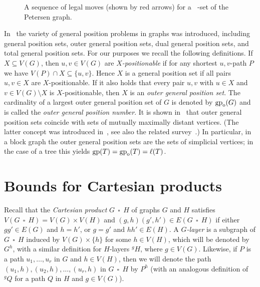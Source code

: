 \documentclass[a4paper,12pt]{article}
\DeclareMathOperator{\mob}{Mob_{gp}}
\DeclareMathOperator{\gp}{gp}
\DeclareMathOperator{\cp}{\,\square\,}
\newcommand{\gpo}{\gp_{\rm o}}
\theoremstyle{definition}
\begin{document}
\begin{figure}[ht!]
		
		\caption{A sequence of legal moves (shown by red arrows) for a $\mob$-set of the Petersen graph.}\label{fig:Petersen-moves}
	\end{figure}
	
	In~\cite{tian-2024+} the variety of general position problems in graphs was introduced, including general position sets, outer general position sets, dual general position sets, and total general position sets. For our purposes we recall the following definitions. If $X\subseteq V(G)$, then $u,v\in V(G)$ are {\em $X$-positionable} if for any shortest $u,v$-path $P$ we have $V(P)\cap X \subseteq \{u,v\}$. Hence $X$ is a general position set if all pairs $u,v\in X$ are $X$-positionable. If it also holds that every pair $u,v$ with $u\in X$ and $v\in V(G) \setminus X$ is $X$-positionable, then $X$ is an \emph{outer general position set}. The cardinality of a largest outer general position set of $G$ is denoted by $\gpo(G)$ and is called the {\em outer general position number}. It is shown in~\cite{tian-2024+} that outer general position sets coincide with sets of mutually maximally distant vertices. (The latter concept was introduced in~\cite{Oellermann-2007}, see also the related survey~\cite{Kuziak-2018}.) In particular, in a block graph the outer general position sets are the sets of simplicial vertices; in the case of a tree this yields $\gp (T) = \gpo (T) = \ell (T)$.
	
	\section{Bounds for Cartesian products}
	\label{sec:Cartesian}
	
	Recall that the {\em Cartesian product} $G\cp H$ of graphs $G$ and $H$ satisfies $V(G\cp H) = V(G)\times V(H)$ and $(g,h)(g',h')\in E(G\cp H)$ if either $gg'\in E(G)$ and $h=h'$, or $g=g'$ and $hh'\in E(H)$. A \emph{$G$-layer} is a subgraph of $G \cp H$ induced by $V(G) \times \{ h\}$ for some $h \in V(H)$, which will be denoted by $G^h$, with a similar definition for $H$-layers $^gH$, where $g\in V(G)$. Likewise, if $P$ is a path $u_1,\dots ,u_{r}$ in $G$ and $h \in V(H)$, then we will denote the path $(u_1,h),(u_2,h),\dots ,(u_{r},h)$ in $G \cp H$ by $P^h$ (with an analogous definition of $^gQ$ for a path $Q$ in $H$ and $g \in V(G)$).
	
\end{document}
